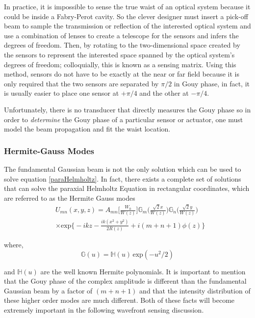 		In practice, it is impossible to sense the true waist of an optical system because it could be inside a Fabry-Perot cavity.  So the clever designer must insert a pick-off beam to sample the transmission or reflection of the interested optical system and use a combination of lenses to create a telescope for the sensors and infers the degrees of freedom.  Then, by rotating to the two-dimensional space created by the sensors to represent the interested space spanned by the optical system's degrees of freedom; colloquially, this is known as a sensing matrix.  Using this method, sensors do not have to be exactly at the near or far field because it is only required that the two sensors are separated by $\pi/2$ in Gouy phase, in fact, it is usually easier to place one sensor at $+\pi/4$ and the other at $-\pi/4$. 
		
		Unfortunately, there is no transducer that directly measures the Gouy phase so in order to \textit{determine} the Gouy phase of a particular sensor or actuator, one must model the beam propagation and fit the waist location.
		
		\subsubsection{Hermite-Gauss Modes}
		The fundamental Gaussian beam is not the only solution which can be used to solve equation \ref{paraHelmholtz}.  In fact, there exists a complete set of solutions that can solve the paraxial Helmholtz Equation in rectangular coordinates, which are referred to as the Hermite Gauss modes
		\begin{equation}\label{HG}
		\begin{aligned}
		&U_{mn}(x,y,z) = A_{mn}\bigg[ \frac{W_0}{W(z)} \bigg] \mathbb{G}_m\Bigg( \frac{\sqrt{2}x}{W(z)}  \Bigg) \mathbb{G}_n\Bigg( \frac{\sqrt{2}y}{W(z)} \Bigg)\\
		&\times \text{exp} \bigg\{ -ikz - \frac{ik(x^2+y^2)}{2R(z)} + i(m+n+1)\phi(z) \bigg\}
		\end{aligned}
		\end{equation}
		
		where,
		\begin{equation}
		\mathbb{G}(u) = \mathbb{H}(u) \, \text{exp}(-u^2/2)
		\end{equation}
		
		and $ \mathbb{H}(u)$ are the well known Hermite polynomials.  It is important to mention that the Gouy phase of the complex amplitude is different than the fundamental Gaussian beam by a factor of $(m + n + 1)$ and that the intensity distribution of these higher order modes are much different. Both of these facts will become extremely important in the following wavefront sensing discussion.
		
